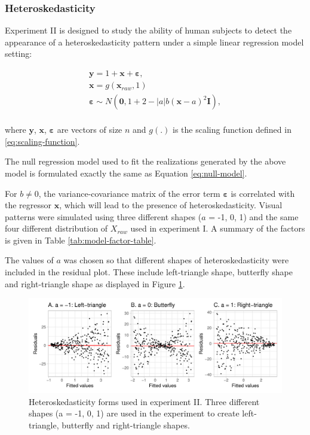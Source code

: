 \documentclass[]{interact}
\theoremstyle{plain}%
\theoremstyle{definition}
\theoremstyle{remark}
\begin{document}
\hypertarget{heteroskedasticity}{%
\subsubsection{Heteroskedasticity}\label{heteroskedasticity}}

Experiment II is designed to study the ability of human subjects to
detect the appearance of a heteroskedasticity pattern under a simple
linear regression model setting:

\begin{align} \label{eq:heter-model}
\boldsymbol{y} = 1 + \boldsymbol{x} + \boldsymbol{\varepsilon},\\
\boldsymbol{x} = g(\boldsymbol{x}_{raw}, 1)\\
\boldsymbol{\varepsilon} \sim N(\boldsymbol{0}, 1 + 2 - |a| b (\boldsymbol{x} - a)^2 \boldsymbol{I}), \\
\end{align}

\noindent where \(\boldsymbol{y}\), \(\boldsymbol{x}\),
\(\boldsymbol{\varepsilon}\) are vectors of size \(n\) and \(g(.)\) is
the scaling function defined in \ref{eq:scaling-function}.

The null regression model used to fit the realizations generated by the
above model is formulated exactly the same as Equation
\ref{eq:null-model}.

For \(b \neq 0\), the variance-covariance matrix of the error term
\(\boldsymbol{\varepsilon}\) is correlated with the regressor
\(\boldsymbol{x}\), which will lead to the presence of
heteroskedasticity. Visual patterns were simulated using three different
shapes (\(a\) = -1, 0, 1) and the same four different distribution of
\(X_{raw}\) used in experiment I. A summary of the factors is given in
Table \ref{tab:model-factor-table}.

The values of \(a\) was chosen so that different shapes of
heteroskedasticity were included in the residual plot. These include
left-triangle shape, butterfly shape and right-triangle shape as
displayed in Figure \ref{fig:different-shape-of-heter}.

\begin{figure}

{\centering \includegraphics[width=1\linewidth]{paper_comparison_files/figure-latex/different-shape-of-heter-1} 

}

\caption{Heteroskedasticity forms used in experiment II. Three different shapes (a = -1, 0, 1) are used in the experiment to create left-triangle, butterfly and right-triangle shapes.}\label{fig:different-shape-of-heter}
\end{figure}
\end{document}
